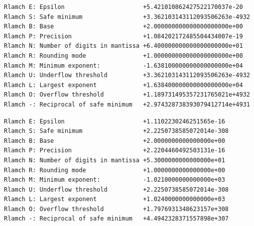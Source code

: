 \documentclass[12pt]{article}
\begin{document}
\begin{table}
\caption{Rlamch values for {\tt \_Float64x}}\label{rlamch_float64x}
\begin{center}
\begin{verbatim}
Rlamch E: Epsilon                      +5.421010862427522170037e-20
Rlamch S: Safe minimum                 +3.362103143112093506263e-4932
Rlamch B: Base                         +2.000000000000000000000e+00
Rlamch P: Precision                    +1.084202172485504434007e-19
Rlamch N: Number of digits in mantissa +6.400000000000000000000e+01
Rlamch R: Rounding mode                +1.000000000000000000000e+00
Rlamch M: Minimum exponent:            -1.638100000000000000000e+04
Rlamch U: Underflow threshold          +3.362103143112093506263e-4932
Rlamch L: Largest exponent             +1.638400000000000000000e+04
Rlamch O: Overflow threshold           +1.189731495357231765021e+4932
Rlamch -: Reciprocal of safe minimum   +2.974328738393079412714e+4931
\end{verbatim}
\end{center}
\end{table}

\begin{table}
\caption{Rlamch values for {\tt double}}\label{rlamch_double}
\begin{center}
\begin{verbatim}
Rlamch E: Epsilon                      +1.1102230246251565e-16
Rlamch S: Safe minimum                 +2.2250738585072014e-308
Rlamch B: Base                         +2.0000000000000000e+00
Rlamch P: Precision                    +2.2204460492503131e-16
Rlamch N: Number of digits in mantissa +5.3000000000000000e+01
Rlamch R: Rounding mode                +1.0000000000000000e+00
Rlamch M: Minimum exponent:            -1.0210000000000000e+03
Rlamch U: Underflow threshold          +2.2250738585072014e-308
Rlamch L: Largest exponent             +1.0240000000000000e+03
Rlamch O: Overflow threshold           +1.7976931348623157e+308
Rlamch -: Reciprocal of safe minimum   +4.4942328371557898e+307
\end{verbatim}
\end{center}
\end{table}
\end{document}
